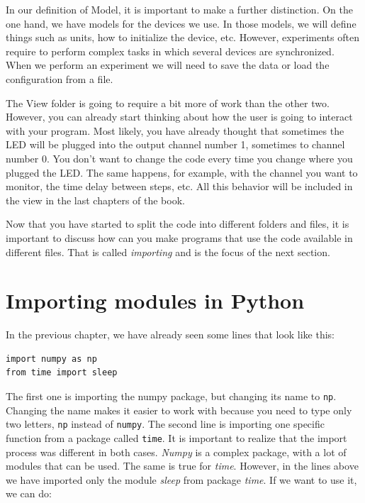 In our definition of Model, it is important to make a further distinction. On the one hand, we have models for the devices we use. In those models, we will define things such as units, how to initialize the device, etc. However, experiments often require to perform complex tasks in which several devices are synchronized. When we perform an experiment we will need to save the data or load the configuration from a file.


The View folder is going to require a bit more of work than the other two. However, you can already start thinking about how the user is going
to interact with your program. Most likely, you have already thought that sometimes the {LED} will be plugged into the output channel number 1,
sometimes to channel number 0. You don't want to change the code every time you change where you plugged the LED. The same happens, for example, with the channel you want to monitor, the time delay between steps, etc. All this behavior will be included in the view in the last chapters of the book.

Now that you have started to split the code into different folders and files, it is important to discuss how can you make programs that use the code available in different files. That is called \emph{importing} and is the focus of the next section.

\section{Importing modules in Python}\label{section:importing-python}
In the previous chapter, we have already seen some lines that look like this:

\begin{verbatim}
import numpy as np
from time import sleep
\end{verbatim}

The first one is importing the numpy package, but changing its name to \texttt{np}. Changing the name makes it easier to work with because you need to type only two letters, \texttt{np} instead of \texttt{numpy}. The second line is importing one specific function from a package called \texttt{time}. It is important to realize that the import process was different in both cases. \emph{Numpy} is a complex package, with a lot of modules that can be used. The same is true for \emph{time}. However, in the lines above we have imported only the module \emph{sleep} from package \emph{time}. If we want to use it, we can do:

